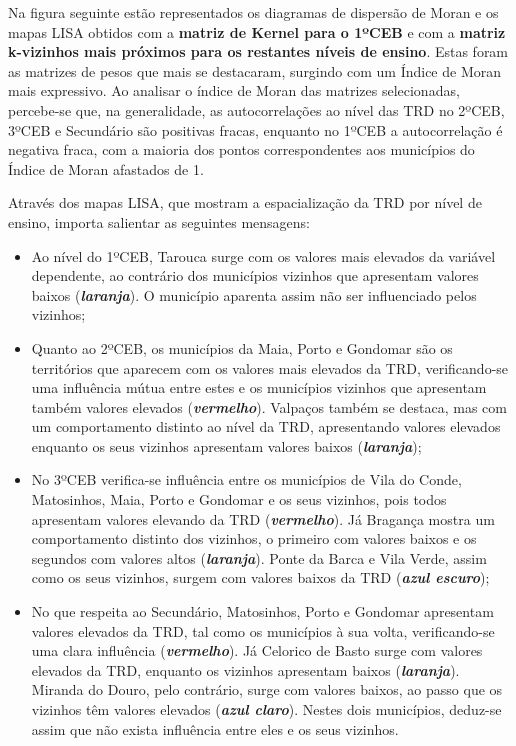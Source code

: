 \documentclass[
]{book}
\providecommand{\tightlist}{%
  \setlength{\itemsep}{0pt}\setlength{\parskip}{0pt}}
\begin{document}
Na figura seguinte estão representados os diagramas de dispersão de Moran e os mapas LISA obtidos com a \textbf{matriz de Kernel para o 1ºCEB} e com a \textbf{matriz k-vizinhos mais próximos para os restantes níveis de ensino}. Estas foram as matrizes de pesos que mais se destacaram, surgindo com um Índice de Moran mais expressivo. Ao analisar o índice de Moran das matrizes selecionadas, percebe-se que, na generalidade, as autocorrelações ao nível das TRD no 2ºCEB, 3ºCEB e Secundário são positivas fracas, enquanto no 1ºCEB a autocorrelação é negativa fraca, com a maioria dos pontos correspondentes aos municípios do Índice de Moran afastados de 1.

Através dos mapas LISA, que mostram a espacialização da TRD por nível de ensino, importa salientar as seguintes mensagens:

\begin{itemize}
\tightlist
\item
  Ao nível do 1ºCEB, Tarouca surge com os valores mais elevados da variável dependente, ao contrário dos municípios vizinhos que apresentam valores baixos (\textbf{\emph{laranja}}). O município aparenta assim não ser influenciado pelos vizinhos;
\item
  Quanto ao 2ºCEB, os municípios da Maia, Porto e Gondomar são os territórios que aparecem com os valores mais elevados da TRD, verificando-se uma influência mútua entre estes e os municípios vizinhos que apresentam também valores elevados (\textbf{\emph{vermelho}}). Valpaços também se destaca, mas com um comportamento distinto ao nível da TRD, apresentando valores elevados enquanto os seus vizinhos apresentam valores baixos (\textbf{\emph{laranja}});
\item
  No 3ºCEB verifica-se influência entre os municípios de Vila do Conde, Matosinhos, Maia, Porto e Gondomar e os seus vizinhos, pois todos apresentam valores elevando da TRD (\textbf{\emph{vermelho}}). Já Bragança mostra um comportamento distinto dos vizinhos, o primeiro com valores baixos e os segundos com valores altos (\textbf{\emph{laranja}}). Ponte da Barca e Vila Verde, assim como os seus vizinhos, surgem com valores baixos da TRD (\textbf{\emph{azul escuro}});
\item
  No que respeita ao Secundário, Matosinhos, Porto e Gondomar apresentam valores elevados da TRD, tal como os municípios à sua volta, verificando-se uma clara influência (\textbf{\emph{vermelho}}). Já Celorico de Basto surge com valores elevados da TRD, enquanto os vizinhos apresentam baixos (\textbf{\emph{laranja}}). Miranda do Douro, pelo contrário, surge com valores baixos, ao passo que os vizinhos têm valores elevados (\textbf{\emph{azul claro}}). Nestes dois municípios, deduz-se assim que não exista influência entre eles e os seus vizinhos.
\end{itemize}
\end{document}
